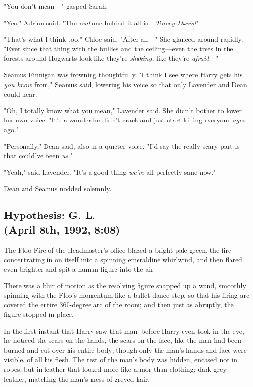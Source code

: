 "You don't mean—" gasped Sarah.

"Yes," Adrian said. "The \emph{real} one behind it all is—\emph{Tracey
Davis!}"

"That's what I think too," Chloe said. "After all—" She glanced around
rapidly. "Ever since that thing with the bullies and the ceiling—even the
trees in the forests around Hogwarts look like they're \emph{shaking,} like
they're \emph{afraid}—"

Seamus Finnigan was frowning thoughtfully. "I think I see where Harry gets
his{\el} \emph{you know{\el}} from," Seamus said, lowering his voice so
that only Lavender and Dean could hear.

"Oh, I totally know what you mean," Lavender said. She didn't bother to lower
her own voice. "It's a wonder he didn't crack and just start killing everyone
\emph{ages} ago."

"Personally," Dean said, also in a quieter voice, "I'd say the really scary
part is—that could've been \emph{us.}"

"Yeah," said Lavender. "It's a good thing \emph{we're} all perfectly sane now."

Dean and Seamus nodded solemnly.
\sbreak
\vspace{-2\baselineskip}
\subsection{Hypothesis: G. L.\\
(April 8th, 1992, 8:08\PM)}

The Floo-Fire of the Headmaster's office blazed a bright pale-green, the fire
concentrating in on itself into a spinning emeraldine whirlwind, and then
flared even brighter and spit a human figure into the air—

There was a blur of motion as the resolving figure snapped up a wand, smoothly
spinning with the Floo's momentum like a ballet dance step, so that his firing
arc covered the entire 360-degree arc of the room; and then just as abruptly,
the figure stopped in place.

In the first instant that Harry saw that man, before Harry even took in the
eye, he noticed the scars on the hands, the scars on the face, like the man had
been burned and cut over his entire body; though only the man's hands and face
were visible, of all his flesh. The rest of the man's body was hidden, encased
not in robes, but in leather that looked more like armor than clothing; dark
grey leather, matching the man's mess of greyed hair.

